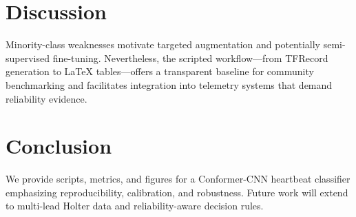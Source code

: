 \documentclass[preprint,3p]{elsarticle}
\begin{document}
\section{Discussion}
Minority-class weaknesses motivate targeted augmentation and potentially semi-supervised fine-tuning. Nevertheless, the scripted workflow---from TFRecord generation to LaTeX tables---offers a transparent baseline for community benchmarking and facilitates integration into telemetry systems that demand reliability evidence.

\section{Conclusion}
We provide scripts, metrics, and figures for a Conformer-CNN heartbeat classifier emphasizing reproducibility, calibration, and robustness. Future work will extend to multi-lead Holter data and reliability-aware decision rules.


\end{document}

